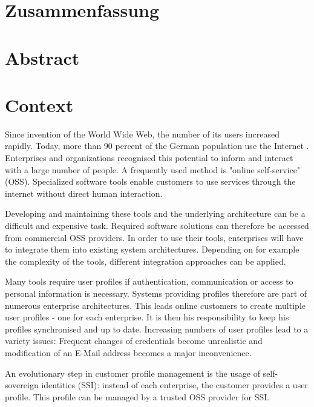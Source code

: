 \documentclass[
     12pt,         %
     a4paper,      %
     BCOR=10mm,version=first,     %
     DIV=14,version=first,        %
     ]{scrreprt}
\begin{document}
\chapter*{Zusammenfassung}

\newpage

\chapter*{Abstract}

\newpage

\tableofcontents
\cleardoublepage
{}

\chapter{Context}
Since invention of the World Wide Web, the number of its users increased rapidly. Today, more than 90 percent of the German population use the Internet \cite{Onlinestudie}. Enterprises and organizations recognised this potential to inform and interact with a large number of people. A frequently used method is "online self-service" (OSS). Specialized software tools enable customers to use services through the internet without direct human interaction.

Developing and maintaining these tools and the underlying architecture can be a difficult and expensive task. Required software solutions can therefore be accessed from commercial OSS providers. In order to use their tools, enterprises will have to integrate them into existing system architectures. Depending on for example the complexity of the tools, different integration approaches can be applied.

Many tools require user profiles if authentication, communication or access to personal information is necessary. Systems providing profiles therefore are part of numerous enterprise architectures. This leads online customers to create multiple user profiles - one for each enterprise. It is then his responsibility to keep his profiles synchronised and up to date. Increasing numbers of user profiles lead to a variety issues: Frequent changes of credentials become unrealistic and modification of an E-Mail address becomes a major inconvenience.

An evolutionary step in customer profile management is the usage of self-sovereign identities (SSI): instead of each enterprise, the customer provides a user profile. This profile can be managed by a trusted OSS provider for SSI.
\end{document}
